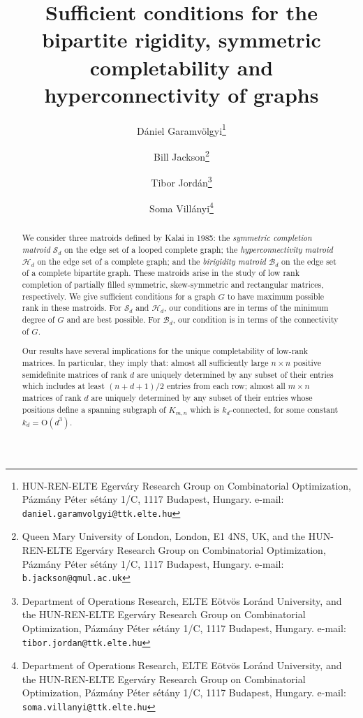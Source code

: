 \documentclass[11pt,a4paper,dvipsnames]{scrartcl}
\begin{document}
\title{Sufficient conditions for the bipartite rigidity, symmetric completability and hyperconnectivity of graphs}



\author{D\'aniel Garamv\"olgyi\thanks{
HUN-REN-ELTE Egerv\'ary Research Group
on Combinatorial Optimization, P\'azm\'any P\'eter s\'et\'any 1/C, 1117 Budapest, Hungary.
e-mail: \texttt{daniel.garamvolgyi@ttk.elte.hu}}
\and
Bill Jackson\thanks{Queen Mary University of London, London, E1 4NS, UK, and
the HUN-REN-ELTE Egerv\'ary Research Group
on Combinatorial Optimization, P\'azm\'any P\'eter s\'et\'any 1/C, 1117 Budapest, Hungary.
e-mail: \texttt{b.jackson@qmul.ac.uk}}
\and
Tibor Jord\'an\thanks{Department of Operations Research, ELTE E\"otv\"os Lor\'and University, and the HUN-REN-ELTE Egerv\'ary Research Group
on Combinatorial Optimization, P\'azm\'any P\'eter s\'et\'any 1/C, 1117 Budapest, Hungary.
e-mail: \texttt{tibor.jordan@ttk.elte.hu}}
\and 
Soma Vill\'anyi\thanks{Department of Operations Research, ELTE E\"otv\"os Lor\'and University, and the HUN-REN-ELTE Egerv\'ary Research Group
on Combinatorial Optimization, P\'azm\'any P\'eter s\'et\'any 1/C, 1117 Budapest, Hungary. e-mail: \texttt{soma.villanyi@ttk.elte.hu}}}



\date{}

\maketitle
\begin{abstract}
    We consider three matroids defined by Kalai in 1985: the \emph{symmetric completion matroid} $\mathcal{S}_d$ on the edge set of a looped complete graph; the \emph{hyperconnectivity matroid} $\mathcal{H}_d$ on the edge set of a complete graph; and the \emph{birigidity matroid} $\mathcal{B}_d$ on the edge set of a complete bipartite graph. These matroids arise in the study of low rank completion of partially filled symmetric, skew-symmetric and rectangular matrices, respectively. We give sufficient  conditions for a graph $G$ to have maximum possible rank in these matroids. For $\mathcal{S}_d$ and $\mathcal{H}_d$, our conditions are in terms of the minimum degree of $G$ and are best possible. For $\mathcal{B}_d$, our condition is in terms of the connectivity of $G$. 
    
    Our results have several implications for the unique completability of low-rank matrices. In particular, they imply that: almost all sufficiently large $n \times n$ positive semidefinite matrices of rank $d$ are uniquely determined by any subset of their entries which includes at least $(n + d + 1)/2$ entries from each row; almost all $m \times n$  matrices of rank $d$ are uniquely determined by any subset of their entries whose positions define a spanning subgraph of $K_{m,n}$ which  is $k_d$-connected, for some constant $k_d=\mbox{O}(d^3)$.
\end{abstract}
\end{document}
